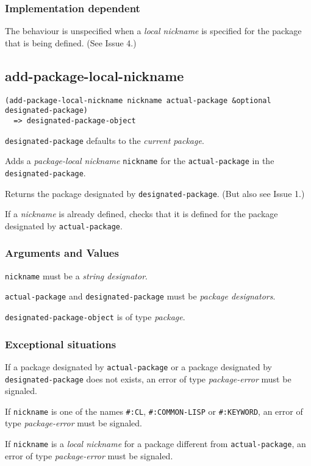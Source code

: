 \documentclass[11pt]{article}
\begin{document}
\subsubsection{Implementation dependent}
\label{sec:org04eab75}
The behaviour is unspecified when a \emph{local nickname} is specified for the package
that is being defined. (See Issue 4.)
\subsection{add-package-local-nickname}
\label{sec:org3945e27}
\begin{verbatim}
(add-package-local-nickname nickname actual-package &optional designated-package)
  => designated-package-object
\end{verbatim}

\texttt{designated-package} defaults to the \emph{current package}.

Adds a \emph{package-local nickname} \texttt{nickname} for the \texttt{actual-package} in the
\texttt{designated-package}.

Returns the package designated by \texttt{designated-package}. (But also see Issue 1.)

If a \emph{nickname} is already defined, checks that it is defined for the package
designated by \texttt{actual-package}.
\subsubsection{Arguments and Values}
\label{sec:org88a8f1b}
\texttt{nickname} must be a \emph{string designator}.

\texttt{actual-package} and \texttt{designated-package} must be \emph{package designators}.

\texttt{designated-package-object} is of type \emph{package}.
\subsubsection{Exceptional situations}
\label{sec:org4b1c53c}
If a package designated by \texttt{actual-package} or a package designated by
\texttt{designated-package} does not exists, an error of type \emph{package-error}
must be signaled.

If \texttt{nickname} is one of the names \texttt{\#:CL}, \texttt{\#:COMMON-LISP} or \texttt{\#:KEYWORD},
an error of type \emph{package-error} must be signaled.

If \texttt{nickname} is a \emph{local nickname} for a package different from
\texttt{actual-package}, an error of type \emph{package-error} must be signaled.
\end{document}
